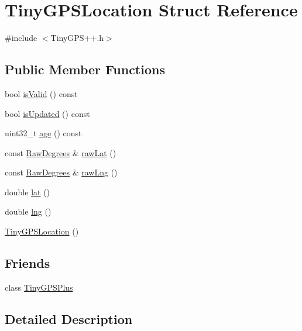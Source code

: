 \hypertarget{struct_tiny_g_p_s_location}{}\section{Tiny\+G\+P\+S\+Location Struct Reference}
\label{struct_tiny_g_p_s_location}


{\ttfamily \#include $<$Tiny\+G\+P\+S++.\+h$>$}

\subsection*{Public Member Functions}
\begin{DoxyCompactItemize}
\item 
bool \hyperlink{struct_tiny_g_p_s_location_a783c2898915440f51a6df233aba51923}{is\+Valid} () const 
\item 
bool \hyperlink{struct_tiny_g_p_s_location_a9aae0a5fd73c2dab231309f1dd3b2c0a}{is\+Updated} () const 
\item 
uint32\+\_\+t \hyperlink{struct_tiny_g_p_s_location_ada111e1b74f82dc029c0c61241424ca8}{age} () const 
\item 
const \hyperlink{struct_raw_degrees}{Raw\+Degrees} \& \hyperlink{struct_tiny_g_p_s_location_abe2a4fbfe28299aae87c5b4c3c58bcad}{raw\+Lat} ()
\item 
const \hyperlink{struct_raw_degrees}{Raw\+Degrees} \& \hyperlink{struct_tiny_g_p_s_location_a9fe126feca0bdcfa9224a428b86d68db}{raw\+Lng} ()
\item 
double \hyperlink{struct_tiny_g_p_s_location_a86c3acea4f317b427eebb667e4d05a49}{lat} ()
\item 
double \hyperlink{struct_tiny_g_p_s_location_a544e9009a5580b2fd5466821a5e5b782}{lng} ()
\item 
\hyperlink{struct_tiny_g_p_s_location_a9bc435af16c3c5224fcd4b5c40d0c70f}{Tiny\+G\+P\+S\+Location} ()
\end{DoxyCompactItemize}
\subsection*{Friends}
\begin{DoxyCompactItemize}
\item 
class \hyperlink{struct_tiny_g_p_s_location_a6501fd5ef19ae166d43e0e5781609ee2}{Tiny\+G\+P\+S\+Plus}
\end{DoxyCompactItemize}


\subsection{Detailed Description}


